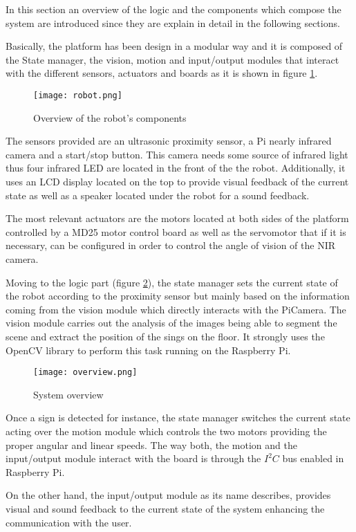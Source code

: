 In this section an overview of the logic and the components which compose the system are introduced since they are explain in detail in the following sections. 

Basically, the platform has been design in a modular way and it is composed of the State manager, the vision, motion and input/output modules that interact with the different sensors, actuators and boards as it is shown in figure \ref{fig:components}.

\begin{figure}[h!]
\centering
	\texttt{[image: robot.png]}
	\caption{Overview of the robot's components}
	\label{fig:components}
\end{figure}

The sensors provided are an ultrasonic proximity sensor, a Pi nearly infrared camera and a start/stop button. This camera needs some source of infrared light thus four infrared LED are located in the front of the the robot. Additionally, it uses an LCD display located on the top to provide visual feedback of the current state as well as a speaker located under the robot for a sound feedback.

\newpage
The most relevant actuators are the motors located at both sides of the platform controlled by a MD25 motor control board as well as the servomotor that if it is necessary, can be configured in order to control the angle of vision of the NIR camera.

Moving to the logic part (figure \ref{fig:overview}), the state manager sets the current state of the robot according to the proximity sensor but mainly based on the information coming from the vision module which directly interacts with the PiCamera. The vision module carries out the analysis of the images being able to segment the scene and extract the position of the sings on the floor. It strongly uses the OpenCV library to perform this task running on the Raspberry Pi. 

\begin{figure}[h!]
     \centering
     \texttt{[image: overview.png]}
     \caption{System overview}
     \label{fig:overview}
\end{figure}

Once a sign is detected for instance, the state manager switches the current state acting over the motion module which controls the two motors providing the proper angular and linear speeds. The way both, the motion and the input/output module interact with the board is through the $I^2C$ bus enabled in Raspberry Pi.

On the other hand, the input/output module as its name describes, provides visual and sound feedback to the current state of the system enhancing the communication with the user.
